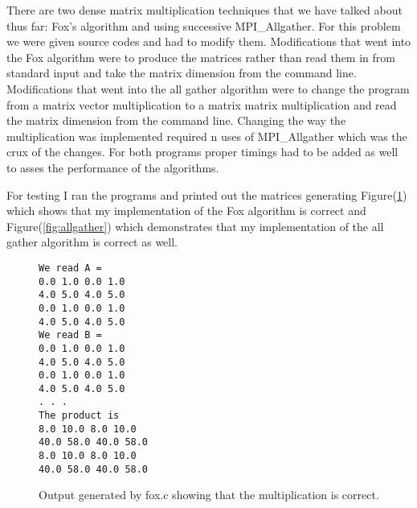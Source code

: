 \documentclass[11pt,a4paper,oneside]{report}
\begin{document}
There are two dense matrix multiplication techniques that we have talked about thus far:  Fox's algorithm and using successive MPI\_Allgather.  For this problem we were given source codes and had to modify them.  Modifications that went into the Fox algorithm were to produce the matrices rather than read them in from standard input and take the matrix dimension from the command line.  Modifications that went into the all gather algorithm were to change the program from a matrix vector multiplication to a matrix matrix multiplication and read the matrix dimension from the command line.  Changing the way the multiplication was implemented required n uses of MPI\_Allgather which was the crux of the changes.  For both programs proper timings had to be added as well to asses the performance of the algorithms.

For testing I ran the programs and printed out the matrices generating Figure(\ref{fig:fox}) which shows that my implementation of the Fox algorithm is correct and 
Figure(\ref{fig:allgather}) which demonstrates that my implementation of the all gather algorithm is correct as well.

\begin{figure}[htpb]
  \texttt{We read A =\\}
  \texttt{0.0  1.0  0.0  1.0 \\}
  \texttt{4.0  5.0  4.0  5.0 \\}
  \texttt{0.0  1.0  0.0  1.0 \\}
  \texttt{4.0  5.0  4.0  5.0 \\}
  \texttt{We read B =\\}
  \texttt{0.0  1.0  0.0  1.0 \\}
  \texttt{4.0  5.0  4.0  5.0 \\}
  \texttt{0.0  1.0  0.0  1.0 \\}
  \texttt{4.0  5.0  4.0  5.0 \\}
  \texttt{. . .\\}
  \texttt{The product is\\}
  \texttt{8.0 10.0  8.0 10.0 \\}
  \texttt{40.0 58.0 40.0 58.0 \\}
  \texttt{8.0 10.0  8.0 10.0 \\}
  \texttt{40.0 58.0 40.0 58.0 \\}
  \caption{Output generated by fox.c showing that the multiplication is correct.}
  \label{fig:fox}
\end{figure}
\end{document}
